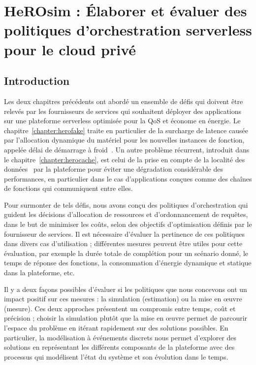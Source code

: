 \chapter{HeROsim : Élaborer et évaluer des politiques d'orchestration serverless pour le cloud privé}
\label{chapter:herosim}

\section{Introduction}
\label{section:herosim-introduction}

Les deux chapitres précédents ont abordé un ensemble de défis qui doivent être relevés par les fournisseurs de services qui souhaitent déployer des applications sur une plateforme serverless optimisée pour la \gls{QoS} et économe en énergie. Le chapitre~\ref{chapter:herofake} traite en particulier de la surcharge de latence causée par l'allocation dynamique du matériel pour les nouvelles instances de fonction, appelée délai de démarrage à froid~\cite{vahidiniaColdStartServerless2020}. Un autre problème récurrent, introduit dans le chapitre~\ref{chapter:herocache}, est celui de la prise en compte de la localité des données~\cite{yuFollowingDataNot, chikhaouiMultiobjectiveOptimizationData2021a} par la plateforme pour éviter une dégradation considérable des performances, en particulier dans le cas d'applications conçues comme des chaînes de fonctions qui communiquent entre elles.

Pour surmonter de tels défis, nous avons conçu des politiques d'orchestration qui guident les décisions d'allocation de ressources et d'ordonnancement de requêtes, dans le but de minimiser les coûts, selon des objectifs d'optimisation définis par le fournisseur de services. Il est nécessaire d'évaluer la pertinence de ces politiques dans divers cas d'utilisation ; différentes mesures peuvent être utiles pour cette évaluation, par exemple la durée totale de complétion pour un scénario donné, le temps de réponse des fonctions, la consommation d'énergie dynamique et statique dans la plateforme, etc.


Il y a deux façons possibles d'évaluer si les politiques que nous concevons ont un impact positif sur ces mesures : la simulation (estimation) ou la mise en œuvre (mesure). Ces deux approches présentent un compromis entre temps, coût et précision ; choisir la simulation plutôt que la mise en œuvre permet de parcourir l'espace du problème en itérant rapidement sur des solutions possibles. En particulier, la modélisation à événements discrets nous permet d'explorer des solutions en représentant les différents composants de la plateforme avec des processus qui modélisent l'état du système et son évolution dans le temps.

